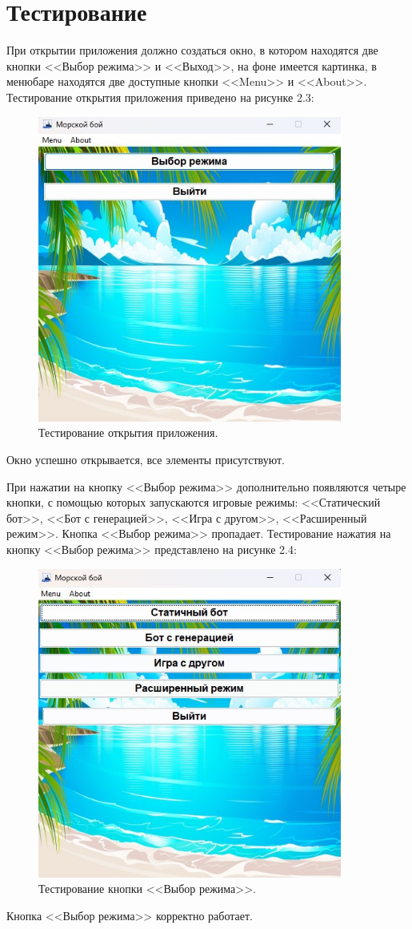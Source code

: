 \section{\label{sec:ch02/sec09}Тестирование}
При открытии приложения должно создаться окно, в котором находятся две кнопки <<Выбор режима>> и <<Выход>>, на фоне имеется картинка, в менюбаре находятся две доступные кнопки <<Menu>> и <<About>>. Тестирование открытия приложения приведено на рисунке 2.3:
\begin{figure}[H]
\graphicspath{ {img/} }
\centering
\includegraphics[width = 10cm]{главное окно.jpg}
\caption{Тестирование открытия приложения.}
\end{figure}
Окно успешно открывается, все элементы присутствуют.

При нажатии на кнопку <<Выбор режима>> дополнительно появляются четыре кнопки, с помощью которых запускаются игровые режимы: <<Статический бот>>, <<Бот с генерацией>>, <<Игра с другом>>, <<Расширенный режим>>. Кнопка <<Выбор режима>> пропадает. Тестирование нажатия на кнопку <<Выбор режима>> представлено на рисунке 2.4:
\begin{figure}[H]
\graphicspath{ {img/} }
\centering
\includegraphics[width = 10cm]{Выбор режима.jpg}
\caption{Тестирование кнопки <<Выбор режима>>.}
\end{figure}
Кнопка <<Выбор режима>> корректно работает.

